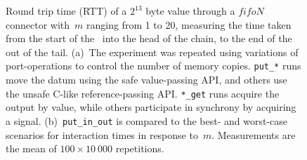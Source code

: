 \begin{figure}
{\begin{subfigure}[b]{0.63\textwidth}
			\caption{}
			\label{fig:fifo_m_1}
		\end{subfigure}%
	}
	\caption[RTT for fifoN connector with $2^{13}$ byte values.]{Round trip time (RTT) of a $2^{13}$ byte value through a $fifoN$ connector with~$m$ ranging from 1 to 20, measuring the time taken from the start of the~ into the head of the chain, to the end of the  out of the tail. (a)~The experiment was repeated using variations of port-operations to control the number of memory copies. \texttt{put\_*} runs move the datum using the safe value-passing API, and others use the unsafe C-like reference-passing API. \texttt{*\_get} runs acquire the output by value, while others participate in synchrony by acquiring a signal. (b)~\texttt{put\_in\_out} is compared to the best- and worst-case scenarios for interaction times in response to~$m$. Measurements are the mean of $100\times{}10~000$ repetitions.}
	\label{fig:fifo_m}
\end{figure}
